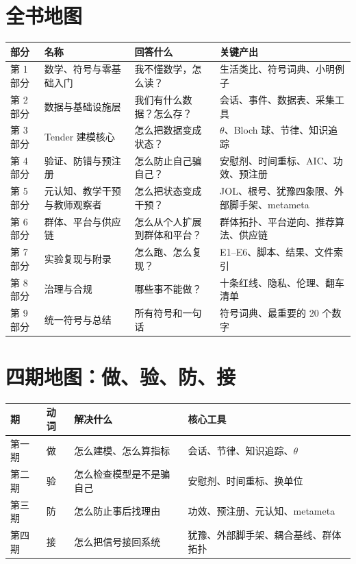 \documentclass[UTF8,a4paper,11pt]{ctexart}
\begin{document}
\section{全书地图}

\begin{center}
\begin{longtable}{@{}p{1.6cm}p{4.0cm}p{4.6cm}p{4.6cm}@{}}
\toprule
\textbf{部分} & \textbf{名称} & \textbf{回答什么} & \textbf{关键产出} \\
\midrule
第 1 部分 & 数学、符号与零基础入门 & 我不懂数学，怎么读？ & 生活类比、符号词典、小明例子 \\
第 2 部分 & 数据与基础设施层 & 我们有什么数据？怎么存？ & 会话、事件、数据表、采集工具 \\
第 3 部分 & Tender 建模核心 & 怎么把数据变成状态？ & $\theta$、Bloch 球、节律、知识追踪 \\
第 4 部分 & 验证、防错与预注册 & 怎么防止自己骗自己？ & 安慰剂、时间重标、AIC、功效、预注册 \\
第 5 部分 & 元认知、教学干预与教师观察者 & 怎么把状态变成干预？ & JOL、根号、犹豫四象限、外部脚手架、metameta \\
第 6 部分 & 群体、平台与供应链 & 怎么从个人扩展到群体和平台？ & 群体拓扑、平台逆向、推荐算法、供应链 \\
第 7 部分 & 实验复现与附录 & 怎么跑、怎么复现？ & E1--E6、脚本、结果、文件索引 \\
第 8 部分 & 治理与合规 & 哪些事不能做？ & 十条红线、隐私、伦理、翻车清单 \\
第 9 部分 & 统一符号与总结 & 所有符号和一句话 & 符号词典、最重要的 20 个数字 \\
\bottomrule
\end{longtable}
\end{center}

\section{四期地图：做、验、防、接}

\begin{center}
\begin{longtable}{@{}p{1.6cm}p{3.0cm}p{4.4cm}p{5.0cm}@{}}
\toprule
\textbf{期} & \textbf{动词} & \textbf{解决什么} & \textbf{核心工具} \\
\midrule
第一期 & 做 & 怎么建模、怎么算指标 & 会话、节律、知识追踪、$\theta$ \\
第二期 & 验 & 怎么检查模型是不是骗自己 & 安慰剂、时间重标、换单位 \\
第三期 & 防 & 怎么防止事后找理由 & 功效、预注册、元认知、metameta \\
第四期 & 接 & 怎么把信号接回系统 & 犹豫、外部脚手架、耦合基线、群体拓扑 \\
\bottomrule
\end{longtable}
\end{center}
\end{document}
